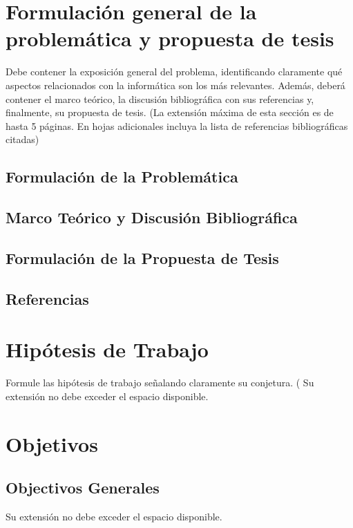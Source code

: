 \documentclass[12pt,spanish]{article}
\begin{document}
\newpage
\section[]{Formulación general de la problemática y propuesta de tesis}

Debe contener la exposición general del problema, identificando
claramente qué aspectos relacionados con la informática son los más
relevantes.  Además, deberá contener el marco teórico, la discusión
bibliográfica con sus referencias y, finalmente, su propuesta de
tesis.  (La extensión máxima de esta sección es de hasta 5 páginas.
En hojas adicionales incluya la lista de referencias bibliográficas
citadas)  

\subsection{Formulación de la Problemática}
\subsection{Marco Teórico y Discusión Bibliográfica}
\subsection{Formulación de la Propuesta de Tesis}
\subsection*{Referencias}

\newpage
\section[]{Hipótesis de Trabajo}

Formule las hipótesis de trabajo señalando claramente su conjetura.
( Su extensión no debe exceder el espacio disponible.

\begin{boxedminipage}{\textwidth}
\hspace{20mm}
\vspace{140 mm} %
\end{boxedminipage}

\newpage
\section[]{Objetivos}
\subsection{Objectivos Generales}
Su extensión no debe exceder el espacio disponible.
\end{document}
